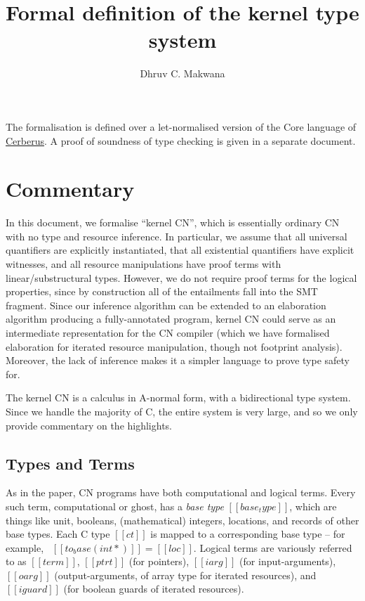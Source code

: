 \documentclass[11pt]{article}%
\title{\vspace{-2cm} Formal definition of the kernel type system}
\author{Dhruv C. Makwana}
\date{}
\begin{document}
\maketitle%


\noindent
The formalisation is defined
over a let-normalised version of the Core language of
\href{https://github.com/rems-project/cerberus}{Cerberus}. A proof of soundness
of type checking is given in a separate document.

{\let\clearpage\relax \tableofcontents}

\section{Commentary}
\label{sec:commentary}

In this document, we formalise ``kernel CN'',
which is essentially ordinary CN with no type and
resource inference. In particular, we assume that all
universal quantifiers are explicitly instantiated, that all
existential quantifiers have explicit witnesses, and all resource
manipulations have proof terms with linear/substructural
types. However, we do not require proof terms for the logical
properties, since by construction all of the entailments fall
into the SMT fragment. Since our inference algorithm can be extended
to an elaboration algorithm producing a fully-annotated program,
kernel CN could serve as an intermediate representation for the CN
compiler (which we have formalised elaboration for iterated resource
manipulation, though not footprint analysis).
Moreover, the lack of inference makes it a simpler language
to prove type safety for.

The kernel CN is a calculus in A-normal form, with a bidirectional
type system. Since we handle the majority of C, the entire system is very
large, and so we only provide commentary on the highlights.

\subsection{Types and Terms}

As in the paper, CN programs have both computational and logical terms.
Every such term, computational or ghost, has a \emph{base type} $[[ base_type ]]$,
which are things like unit, booleans, (mathematical) integers, locations,
and records of other base types. Each C type $[[ ct ]]$ is mapped to a
corresponding base type -- for example, \ $[[ to_base ( int * ) ]] = [[ loc ]]$.
Logical terms are variously referred to as $[[ term ]]$, $[[ ptrt ]]$
(for pointers), $[[ iarg ]]$ (for
input-arguments), $[[ oarg ]]$ (output-arguments, of array type for
iterated resources), and $[[ iguard ]]$ (for boolean guards of iterated resources).
\end{document}
